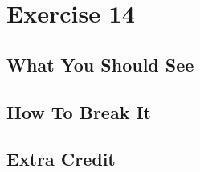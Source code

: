 \chapter{Exercise 14}


\section{What You Should See}


\section{How To Break It}


\section{Extra Credit}



